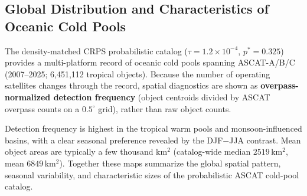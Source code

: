 \subsection{Global Distribution and Characteristics of Oceanic Cold Pools}

The density-matched CRPS probabilistic catalog
($\tau=1.2\times10^{-4}$, $p^*=0.325$) provides a multi-platform record of oceanic
cold pools spanning ASCAT-A/B/C (2007--2025;
6,451,112 tropical objects). Because the number of operating satellites
changes through the record, spatial diagnostics are shown as
\textbf{overpass-normalized detection frequency}
(object centroids divided by ASCAT overpass counts on a $0.5^\circ$ grid), rather than
raw object counts.

Detection frequency is highest in the tropical warm pools and monsoon-influenced basins,
with a clear seasonal preference revealed by the DJF$-$JJA contrast. Mean object areas
are typically a few thousand km$^2$ (catalog-wide median $2519$\,km$^2$,
mean $6849$\,km$^2$). Together these maps summarize the global
spatial pattern, seasonal variability, and characteristic sizes of the probabilistic
ASCAT cold-pool catalog.


